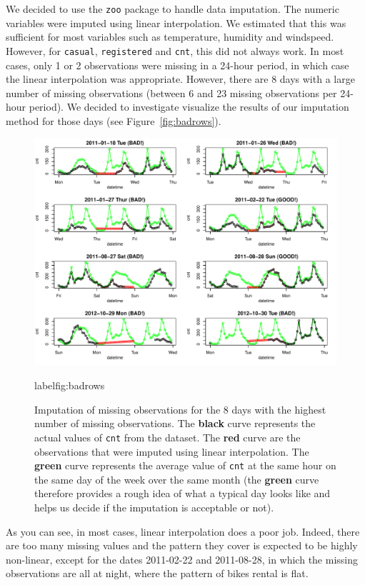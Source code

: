 \documentclass[12pt]{article}
\begin{document}
We decided to use the \texttt{zoo} package to handle data imputation. The numeric variables were imputed using linear interpolation. We estimated that this was sufficient for most variables such as temperature, humidity and windspeed. However, for \texttt{casual}, \texttt{registered} and \texttt{cnt}, this did not always work. In most cases, only 1 or 2 observations were missing in a 24-hour period, in which case the linear interpolation was appropriate. However, there are 8 days with a large number of missing observations (between 6 and 23 missing observations per 24-hour period). We decided to investigate visualize the results of our imputation method for those days (see Figure~\ref{fig:badrows}).
\begin{figure}[H]
	\centering
	\includegraphics[width=.98\textwidth]{figures/badrows.pdf}
	\caption{Imputation of missing observations for the 8 days with the highest number of missing observations. The {\textbf{\color{black}black}} curve represents the actual values of \texttt{cnt} from the dataset. The {\textbf{\color{red}red}} curve are the observations that were imputed using linear interpolation. The {\textbf{\color{green}green}} curve represents the average value of \texttt{cnt} at the same hour on the same day of the week over the same month (the {\textbf{\color{green}green}} curve therefore provides a rough idea of what a typical day looks like and helps us decide if the imputation is acceptable or not).}
	label{fig:badrows}
\end{figure}
As you can see, in most cases, linear interpolation does a poor job. Indeed, there are too many missing values and the pattern they cover is expected to be highly non-linear, except for the dates 2011-02-22 and 2011-08-28, in which the missing observations are all at night, where the pattern of bikes rental is flat.
\end{document}
